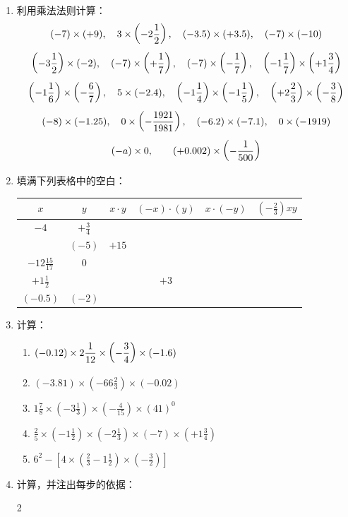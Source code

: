 \begin{enumerate}
\item 利用乘法法则计算：
\[(-7)\times (+9),\quad 3\times\left(-2\dfrac{1}{2}\right),\quad (-3.5)\times (+3.5),\quad (-7)\times(-10) \]
\[ \left(-3\dfrac{1}{2}\right)\times (-2),\quad (-7)\times\left(+\dfrac{1}{7}\right),\quad (-7)\times\left(-\dfrac{1}{7}\right) ,\quad \left(-1\dfrac{1}{7}\right)\times\left(+1\dfrac{3}{4}\right) \]
\[\left(-1\dfrac{1}{6}\right)\times\left(-\dfrac{6}{7}\right),\quad 5\times (-2.4),\quad \left(-1\dfrac{1}{4}\right)\times\left(-1\dfrac{1}{5}\right),\quad \left(+2\dfrac{2}{3}\right)\times\left(-\dfrac{3}{8}\right) \]
\[(-8)\times (-1.25),\quad 0\times\left(-\dfrac{1921}{1981}\right),\quad (-6.2)\times (-7.1),\quad 0\times (-1919)\]
\[(-a)\times 0,\qquad (+0.002)\times \left(-\dfrac{1}{500}\right)\]

\item 填满下列表格中的空白：
\begin{center}
    \renewcommand{\arraystretch}{1.8}
    \begin{tabular}{c|c|c|c|c|c}
    \hline
    $x$  &  $y$  &  $x\cdot y$  &  $(-x)\cdot (y)$  &     $x\cdot (-y)$  &  $\left(-\frac{2}{3}\right)xy$\\
    \hline
    $-4$ & $+\frac{3}{4}$ &&&&\\
& $(-5)$ & $+15$ &&& \\
$-12\frac{15}{17}$ & 0&&&&\\
$+1\frac{1}{2}$ & & & $+3$&&\\
$(-0.5)$ & $(-2)$ &&&&\\
    \hline
    \end{tabular}    
    \end{center}

\item 计算：
\begin{enumerate}
    \item $(-0.12)\times 2\dfrac{1}{12}\times\left(-\dfrac{3}{4}\right)\times(-1.6)$
 \item $(-3.81) \times\left(-66 \frac{2}{3}\right) \times(-0.02)$
\item $1 \frac{7}{8} \times\left(-3 \frac{1}{3}\right) \times\left(-\frac{4}{15}\right) \times(41)^{0}$
\item $\frac{2}{5} \times\left(-1 \frac{1}{2}\right) \times\left(-2 \frac{1}{3}\right) \times(-7) \times\left(+1 \frac{3}{4}\right)$
\item  $6^{2}-\left[4 \times\left(\frac{2}{3}-1 \frac{1}{2}\right) \times\left(-\frac{3}{2}\right)\right]$
\end{enumerate}


\item 计算，并注出每步的依据：
\begin{enumerate}
    \begin{multicols}{2}
        

\end{multicols}
\end{enumerate}
\end{enumerate}

